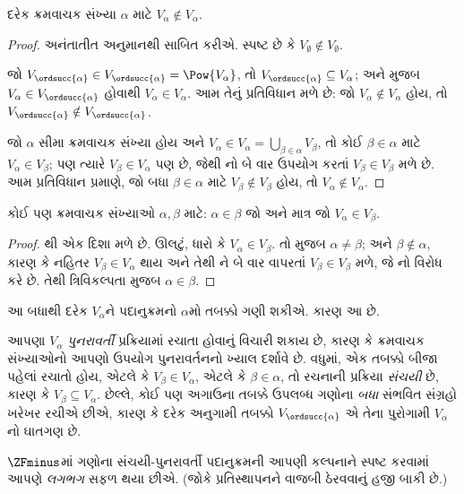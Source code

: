 \documentclass[../../../include/open-logic-section]{subfiles}
\begin{document}
\begin{lem}
દરેક ક્રમવાચક સંખ્યા $\alpha$ માટે $V_\alpha \notin V_\alpha$.
\end{lem}

\begin{proof}
અનંતાતીત અનુમાનથી સાબિત કરીએ. સ્પષ્ટ છે કે
$V_\emptyset \notin V_\emptyset$.

જો $V_{\ordsucc{\alpha}} \in V_{\ordsucc{\alpha}} = \Pow{V_\alpha}$,
તો $V_{\ordsucc{\alpha}} \subseteq V_\alpha$; અને
 મુજબ $V_\alpha
\in V_{\ordsucc{\alpha}}$ હોવાથી
$V_\alpha \in V_\alpha$. આમ તેનું પ્રતિવિધાન મળે છે: જો
$V_\alpha \notin V_\alpha$ હોય, તો
$V_{\ordsucc{\alpha}} \notin V_{\ordsucc{\alpha}}$.

જો $\alpha$ સીમા ક્રમવાચક સંખ્યા હોય અને
$V_\alpha \in V_\alpha = \bigcup_{\beta \in
\alpha}V_\beta$, તો કોઈ $\beta \in
\alpha$ માટે $V_\alpha \in V_\beta$; પણ ત્યારે
$V_\beta \in V_\alpha$ પણ છે, જેથી
નો બે વાર ઉપયોગ કરતાં $V_\beta \in
V_\beta$ મળે છે. આમ પ્રતિવિધાન પ્રમાણે, જો બધા $\beta \in \alpha$
માટે $V_\beta
\notin V_\beta$ હોય, તો $V_\alpha \notin
V_\alpha$.
\end{proof}

\begin{cor}
કોઈ પણ ક્રમવાચક સંખ્યાઓ $\alpha, \beta$ માટે:
$\alpha \in \beta$ જો અને માત્ર જો $V_\alpha \in V_\beta$.
\end{cor}

\begin{proof}
થી એક દિશા મળે છે. ઊલટું, ધારો કે
$V_\alpha \in V_\beta$. તો  મુજબ
$\alpha \neq \beta$; અને $\beta \notin \alpha$, કારણ કે
નહિતર $V_\beta \in V_\alpha$ થાય અને તેથી
ને બે વાર વાપરતાં
$V_\beta \in V_\beta$ મળે, જે નો
વિરોધ કરે છે. તેથી ત્રિવિકલ્પતા મુજબ $\alpha \in \beta$.
\end{proof}
\noindent
આ બધાથી દરેક $V_\alpha$ને પદાનુક્રમનો $\alpha$મો તબક્કો
ગણી શકીએ. કારણ આ છે.

આપણા $V_\alpha$ \emph{પુનરાવર્તી} પ્રક્રિયામાં રચાતા હોવાનું
વિચારી શકાય છે, કારણ કે ક્રમવાચક સંખ્યાઓનો આપણો ઉપયોગ
પુનરાવર્તનનો ખ્યાલ દર્શાવે છે. વધુમાં, એક તબક્કો બીજા પહેલાં
રચાતો હોય, એટલે કે $V_\beta \in V_\alpha$, એટલે કે
$\beta \in \alpha$, તો રચનાની પ્રક્રિયા \emph{સંચયી} છે,
કારણ કે $V_\beta \subseteq V_\alpha$. છેલ્લે, કોઈ પણ અગાઉના
તબક્કે ઉપલબ્ધ ગણોના \emph{બધા} સંભવિત સંગ્રહો ખરેખર રચીએ
છીએ, કારણ કે દરેક અનુગામી તબક્કો $V_{\ordsucc{\alpha}}$
એ તેના પુરોગામી $V_\alpha$નો ઘાતગણ છે.

$\ZFminus$માં ગણોના સંચયી-પુનરાવર્તી પદાનુક્રમની આપણી
કલ્પનાને સ્પષ્ટ કરવામાં આપણે \emph{લગભગ} સફળ થયા છીએ.
(જોકે પ્રતિસ્થાપનને વાજબી ઠેરવવાનું હજી બાકી છે.)
\end{document}
